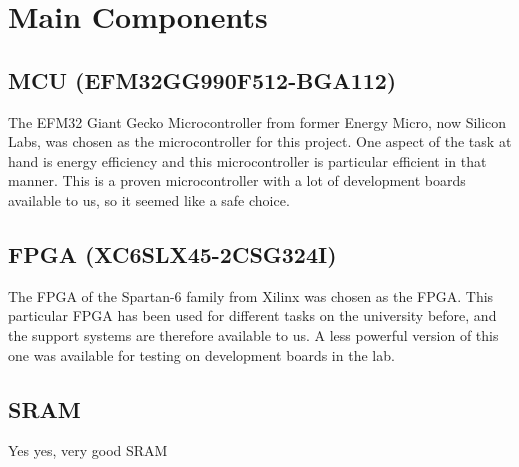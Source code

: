 \documentclass[../main/report.tex]{subfiles}
\begin{document}
\section{Main Components}

\subsection*{MCU (EFM32GG990F512-BGA112)}
The EFM32 Giant Gecko Microcontroller from former Energy Micro, now Silicon Labs, was chosen as the microcontroller for this project.
One aspect of the task at hand is energy efficiency and this microcontroller is particular efficient in that manner.
This is a proven microcontroller with a lot of development boards available to us, so it seemed like a safe choice.

\subsection*{FPGA (XC6SLX45-2CSG324I)}
The FPGA of the Spartan-6 family from Xilinx was chosen as the FPGA.
This particular FPGA has been used for different tasks on the university before, and the support systems are therefore available to us.
A less powerful version of this one was available for testing on development boards in the lab.

\subsection*{SRAM}
Yes yes, very good SRAM 
\end{document}
